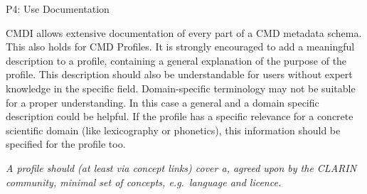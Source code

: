 P4: Use Documentation

 

CMDI allows extensive documentation of every part of a CMD metadata schema. This also holds for CMD Profiles. It is strongly encouraged to add a meaningful description to a profile, containing a general explanation of the purpose of the profile. This description should also be understandable for users without expert knowledge in the specific field. Domain-specific terminology may not be suitable for a proper
understanding. In this case a general and a domain specific description could be helpful. If the profile has a specific relevance for a concrete scientific domain (like lexicography or phonetics), this information should be specified for the profile too.

\begin{workinprogress}

 

\emph{A profile should (at least via concept links) cover a, agreed upon by the CLARIN community, minimal set of concepts, e.g.~language and licence.}

\end{workinprogress}